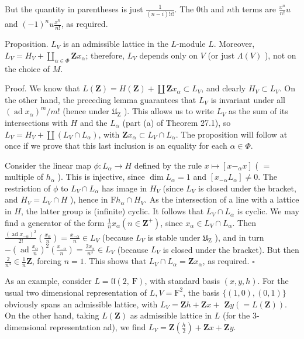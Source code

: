 \documentclass[10pt]{article}
\begin{document}
But the quantity in parentheses is just $\frac{1}{(n-i)!i!}$. The 0th and $n$th terms are $\frac{x^{n}}{n!} u$ and $(-1)^{n} u \frac{x^{n}}{n!}$, as required.

Proposition. $L_{V}$ is an admissible lattice in the $L$-module $L$. Moreover, $L_{V}=H_{V}+\coprod_{\alpha \in \Phi} \mathbf{Z} x_{\alpha}$; therefore, $L_{V}$ depends only on $V$ (or just $\Lambda(V)$ ), not on the choice of $M$.

Proof. We know that $L(\mathbf{Z})=H(\mathbf{Z})+\coprod \mathbf{Z} x_{\alpha} \subset L_{V}$, and clearly $H_{V} \subset L_{V}$. On the other hand, the preceding lemma guarantees that $L_{V}$ is invariant under all $\left(\operatorname{ad} x_{\alpha}\right)^{m} / m!$ (hence under $\mathfrak{U}_{\mathrm{Z}}$ ). This allows us to write $L_{V}$ as the sum of its intersections with $H$ and the $L_{\alpha}$ (part (a) of Theorem 27.1), so $L_{V}=H_{V}+\coprod\left(L_{V} \cap L_{\alpha}\right)$, with $\mathbf{Z} x_{\alpha} \subset L_{V} \cap L_{\alpha}$. The proposition will follow at once if we prove that this last inclusion is an equality for each $\alpha \in \Phi$.

Consider the linear map $\phi: L_{\alpha} \rightarrow H$ defined by the rule $x \mapsto\left[x-_{\alpha} x\right]$ ( $=$ multiple of $h_{\alpha}$ ). This is injective, since $\operatorname{dim} L_{\alpha}=1$ and $\left[x_{-\alpha} L_{\alpha}\right] \neq 0$. The restriction of $\phi$ to $L_{V} \cap L_{\alpha}$ has image in $H_{V}$ (since $L_{V}$ is closed under the bracket, and $H_{V}=L_{V} \cap H$ ), hence in $\mathrm{F} h_{\alpha} \cap H_{V}$. As the intersection of a line with a lattice in $H$, the latter group is (infinite) cyclic. It follows that $L_{V} \cap L_{\alpha}$ is cyclic. We may find a generator of the form $\frac{1}{n} x_{\alpha}\left(n \in \mathbf{Z}^{+}\right)$, since $x_{\alpha} \in L_{V} \cap L_{\alpha}$. Then $\frac{\left(\operatorname{ad} x_{-\alpha}\right)^{2}}{2!}\left(\frac{x_{\alpha}}{n}\right)=\frac{x_{-\alpha}}{n} \in L_{V}$ (because $L_{V}$ is stable under $\mathfrak{U}_{\mathrm{Z}}$ ), and in turn $-\left(\operatorname{ad} \frac{x_{\alpha}}{n}\right)^{2}\left(\frac{x_{-\alpha}}{n}\right)=\frac{2 x_{\alpha}}{n^{3}} \in L_{V}$ (because $L_{V}$ is closed under the bracket). But then $\frac{2}{n^{3}} \in \frac{1}{n} \mathbf{Z}$, forcing $n=1$. This shows that $L_{V} \cap L_{\alpha}=\mathbf{Z} x_{\alpha}$, as required. $\square$

As an example, consider $L=\mathfrak{l l}(2, \mathrm{~F})$, with standard basis $(x, y, h)$. For the usual two dimensional representation of $L, V=\mathrm{F}^{2}$, the basis $\{(1,0),(0,1)\}$ obviously spans an admissible lattice, with $L_{V}=\mathbf{Z} h+\mathbf{Z} x+$ $\mathbf{Z} y(=L(\mathbf{Z}))$. On the other hand, taking $L(\mathbf{Z})$ as admissible lattice in $L$ (for the 3-dimensional representation ad), we find $L_{V}=\mathbf{Z}\left(\frac{h}{2}\right)+\mathbf{Z} x+\mathbf{Z} y$.
\end{document}
